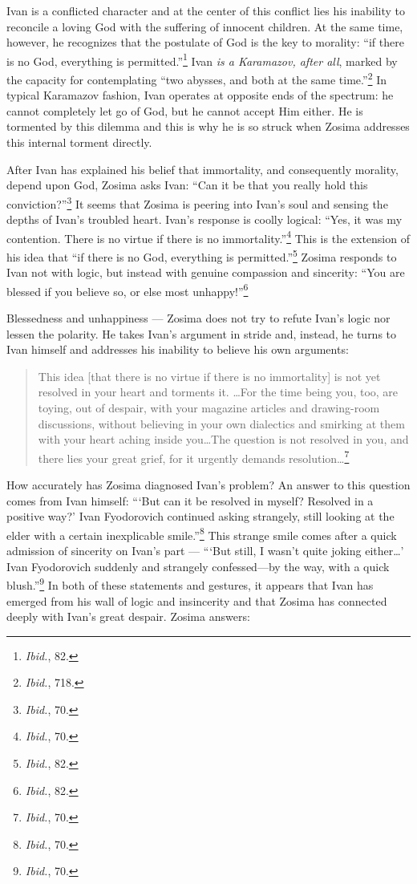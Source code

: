 Ivan is a conflicted character and at the center of this conflict lies his inability to reconcile a loving God with the suffering of innocent children. At the same time, however, he recognizes that the postulate of God is the key to morality: ``if there is no God, everything is permitted.''\footnote{\emph{Ibid.}, 82.} Ivan \emph{is a Karamazov, after all}, marked by the capacity for contemplating ``two abysses, and both at the same time.''\footnote{\emph{Ibid.}, 718.} In typical Karamazov fashion, Ivan operates at opposite ends of the spectrum: he cannot completely let go of God, but he cannot accept Him either. He is tormented by this dilemma and this is why he is so struck when Zosima addresses this internal torment directly.

After Ivan has explained his belief that immortality, and consequently morality, depend upon God, Zosima asks Ivan: ``Can it be that you really hold this conviction?''\footnote{\emph{Ibid.}, 70.} It seems that Zosima is peering into Ivan's soul and sensing the depths of Ivan's troubled heart. Ivan's response is coolly logical: ``Yes, it was my contention. There is no virtue if there is no immortality.''\footnote{\emph{Ibid.}, 70.} This is the extension of his idea that ``if there is no God, everything is permitted.''\footnote{\emph{Ibid.}, 82.} Zosima responds to Ivan not with logic, but instead with genuine compassion and sincerity: ``You are blessed if you believe so, or else most unhappy!''\footnote{\emph{Ibid.}, 82.}

Blessedness and unhappiness --- Zosima does not try to refute Ivan's logic nor lessen the polarity. He takes Ivan's argument in stride and, instead, he turns to Ivan himself and addresses his inability to believe his own arguments: 

\begin{quote}
\singlespacing
This idea [that there is no virtue if there is no immortality] is not yet resolved in your heart and torments it. \ldots For the time being you, too, are toying, out of despair, with your magazine articles and drawing-room discussions, without believing in your own dialectics and smirking at them with your heart aching inside you\ldots The question is not resolved in you, and there lies your great grief, for it urgently demands resolution\ldots \footnote{\emph{Ibid.}, 70.}
\end{quote}

How accurately has Zosima diagnosed Ivan's problem? An answer to this question comes from Ivan himself: ``\thinspace`But can it be resolved in myself? Resolved in a positive way?' Ivan Fyodorovich continued asking strangely, still looking at the elder with a certain inexplicable smile.''\footnote{\emph{Ibid.}, 70.} This strange smile comes after a quick admission of sincerity on Ivan's part --- ``\thinspace`But still, I wasn't quite joking either\ldots' Ivan Fyodorovich suddenly and strangely confessed---by the way, with a quick blush.''\footnote{\emph{Ibid.}, 70.} In both of these statements and gestures, it appears that Ivan has emerged from his wall of logic and insincerity and that Zosima has connected deeply with Ivan's great despair. Zosima answers: 

